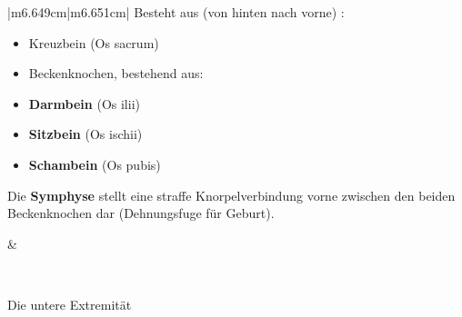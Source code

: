 \documentclass{article}
\newcommand\gT[1]{\textbf{\textup{\textcolor[rgb]{0.0,0.5019608,0.0}{#1}}}}
\newcommand\gZ[1]{\textcolor[rgb]{0.5019608,0.5019608,0.5019608}{#1}}
\begin{document}
\begin{center}
\tablehead{}\begin{supertabular}{|m{6.649cm}|m{6.651cm}|}
\hline
{\mdseries Besteht aus (von hinten nach vorne) :}

\begin{itemize}
\item {\mdseries Kreuzbein \gZ{(Os sacrum)}}

\item {\mdseries Beckenknochen, bestehend aus:}

\end{itemize}
\begin{itemize}
\item {\mdseries {}\gT{Darmbein}
\gZ{(Os ilii)}}

\item {\mdseries {}\gT{Sitzbein}
\gZ{(Os ischii)}}

\item {\mdseries
{}\gT{Schambein}\gZ{
}\gZ{(Os pubis)}}

\end{itemize}
{\mdseries Die \gT{Symphyse} stellt eine
straffe Knorpelverbindung vorne zwischen den beiden Beckenknochen dar
(Dehnungs\-fuge f\"ur Geburt).}

 &
{%
 \par}

\\\hline
\end{supertabular}
\end{center}
{\mdseries\color[rgb]{0.0,0.0,0.5019608}
Die untere Extremit\"at}
\end{document}
